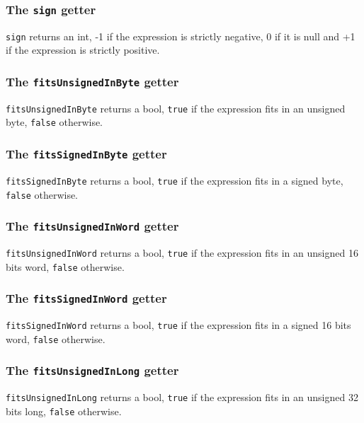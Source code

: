 \documentclass[10pt,openright,twosides]{report}
\newcommand{\icst}[1]{{\footnotesize\ttfamily\colorbox{light-blue}{#1}}}
\newcommand{\gtlinline}[1]{\colorbox{light-blue}{\lstinline[language=gtl]{#1}}}
\begin{document}
\subsubsection{The \texttt{sign} getter}

\gtlinline{sign} returns an int, \icst{-1} if the expression is strictly negative, \icst{0} if it is null and \icst{+1} if the expression is strictly positive.


\subsubsection{The \texttt{fitsUnsignedInByte} getter}

\gtlinline{fitsUnsignedInByte} returns a bool, \gtlinline{true} if the expression fits in an unsigned byte, \gtlinline{false} otherwise.

\subsubsection{The \texttt{fitsSignedInByte} getter}

\gtlinline{fitsSignedInByte} returns a bool, \gtlinline{true} if the expression fits in a signed byte, \gtlinline{false} otherwise.

\subsubsection{The \texttt{fitsUnsignedInWord} getter}

\gtlinline{fitsUnsignedInWord} returns a bool, \gtlinline{true} if the expression fits in an unsigned 16 bits word, \gtlinline{false} otherwise.

\subsubsection{The \texttt{fitsSignedInWord} getter}

\gtlinline{fitsSignedInWord} returns a bool, \gtlinline{true} if the expression fits in a signed 16 bits word, \gtlinline{false} otherwise.

\subsubsection{The \texttt{fitsUnsignedInLong} getter}

\gtlinline{fitsUnsignedInLong} returns a bool, \gtlinline{true} if the expression fits in an unsigned 32 bits long, \gtlinline{false} otherwise.
\end{document}
